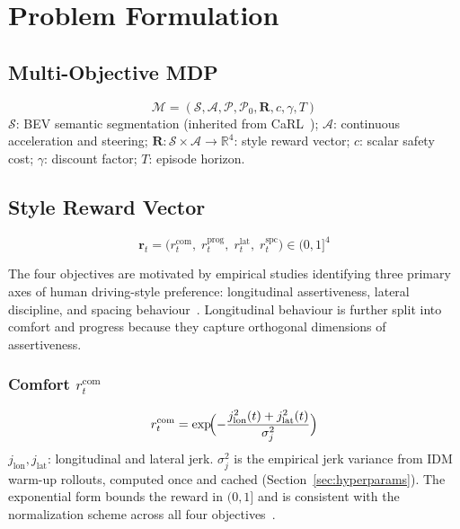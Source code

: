 \documentclass[conference]{IEEEtran}
\begin{document}
\section{Problem Formulation}\label{sec:formulation}

\subsection{Multi-Objective MDP}

\begin{equation}
\mathcal{M}=(\mathcal{S},\mathcal{A},\mathcal{P},\mathcal{P}_{0},
             \mathbf{R},c,\gamma,T)
\end{equation}
$\mathcal{S}$: BEV semantic segmentation (inherited from
CaRL~\cite{CaRL2025}); $\mathcal{A}$: continuous acceleration and
steering; $\mathbf{R}:\mathcal{S}\!\times\!\mathcal{A}\!\to\!\mathbb{R}^{4}$:
style reward vector; $c$: scalar safety cost; $\gamma$: discount factor;
$T$: episode horizon.

\subsection{Style Reward Vector}\label{sec:rewards}

\begin{equation}
\mathbf{r}_{t}=\bigl(r^{\text{com}}_{t},\;r^{\text{prog}}_{t},\;
               r^{\text{lat}}_{t},\;r^{\text{spc}}_{t}\bigr)\in(0,1]^{4}
\end{equation}

The four objectives are motivated by empirical studies identifying three
primary axes of human driving-style preference: longitudinal
assertiveness, lateral discipline, and spacing
behaviour~\cite{Yusof2016,NatDriving2023}. Longitudinal behaviour is
further split into comfort and progress because they capture orthogonal
dimensions of assertiveness.

\subsubsection{Comfort $r^{\text{com}}_{t}$}

\begin{equation}
r^{\text{com}}_{t}=
  \exp\!\Bigl(-\frac{j_{\text{lon}}^{2}(t)+j_{\text{lat}}^{2}(t)}
                    {\sigma_{j}^{2}}\Bigr)
\label{eq:comfort}
\end{equation}
$j_{\text{lon}},j_{\text{lat}}$: longitudinal and lateral jerk.
$\sigma_{j}^{2}$ is the empirical jerk variance from IDM warm-up
rollouts, computed once and cached (Section~\ref{sec:hyperparams}).
The exponential form bounds the reward in $(0,1]$ and is consistent
with the normalization scheme across all four
objectives~\cite{RewardReview2024}.
\end{document}
